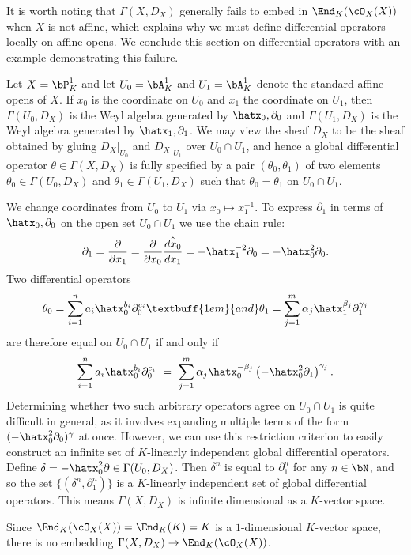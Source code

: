 It is worth noting that $\Gamma(X,D_X)$ generally fails to embed in $\End_K(\cO_X(X))$ when $X$ is not affine, which explains why we must define differential operators locally on affine opens. We conclude this section on differential operators with an example demonstrating this failure.
\begin{example}\label{example:diff-op-on-proj}
	Let $X = \bP^1_K$ and let $U_0 = \bA^1_K$ and $U_1 = \bA^1_K$ denote the standard affine opens of $X$. If $x_0$ is the coordinate on $U_0$ and $x_1$ the coordinate on $U_1$, then $\Gamma(U_0,D_X)$ is the Weyl algebra generated by $\hatx_0,\partial_0$ and $\Gamma(U_1,D_X)$ is the Weyl algebra generated by $\hatx_1,\partial_1$. We may view the sheaf $D_X$ to be the sheaf obtained by gluing $D_X|_{U_0}$ and $D_X|_{U_1}$ over $U_0\cap U_1$, and hence a global differential operator $\theta \in \Gamma(X,D_X)$ is fully specified by a pair $(\theta_0,\theta_1)$ of two elements $\theta_0 \in \Gamma(U_0, D_X)$ and $\theta_1 \in \Gamma(U_1,D_X)$ such that $\theta_0 = \theta_1$ on $U_0\cap U_1$.

	We change coordinates from $U_0$ to $U_1$ via $x_0 \mapsto x_1^{-1}$. To express $\partial_1$ in terms of $\hatx_0,\partial_0$ on the open set $U_0\cap U_1$ we use the chain rule:
	\begin{align*}
		\partial_1 = \frac{\partial}{\partial x_1} = \frac{\partial}{\partial x_0}\hat{\frac{dx_0}{dx_1}} = -\hatx_1^{-2}\partial_0 = -\hatx_0^2\partial_0.
	\end{align*}
	Two differential operators
	\begin{align*}
		\theta_0 = \sum_{i=1}^n a_i\hatx_0^{b_i} \partial_0^{c_i} \textbuff{1em}{and} \theta_1 = \sum_{j=1}^m \alpha_j\hatx_1^{\beta_j} \partial_1^{\gamma_j}
	\end{align*}
	are therefore equal on $U_0\cap U_1$ if and only if
	\begin{align*}
		\sum_{i=1}^n a_i\hatx_0^{b_i} \partial_0^{c_i} ~=~ \sum_{j=1}^m \alpha_j\hatx_0^{-\beta_j} \left(-\hatx_0^2\partial_1\right)^{\gamma_j}.
	\end{align*}
	Determining whether two such arbitrary operators agree on $U_0\cap U_1$ is quite difficult in general, as it involves expanding multiple terms of the form $(-\hatx_0^2\partial_0)^{\gamma}$ at once. However, we can use this restriction criterion to easily construct an infinite set of $K$-linearly independent global differential operators. Define $\delta = -\hatx_0^2\partial \in \Gamma(U_0,D_X)$. Then $\delta^n$ is equal to $\partial_1^n$ for any $n \in \bN$, and so the set $\{(\delta^n,\partial_1^n)\}$ is a $K$-linearly independent set of global differential operators. This means $\Gamma(X,D_X)$ is infinite dimensional as a $K$-vector space.

	Since $\End_K(\cO_X(X)) = \End_K(K) = K$ is a $1$-dimensional $K$-vector space, there is no embedding $\Gamma(X,D_X) \to \End_K(\cO_X(X))$.
\end{example}

